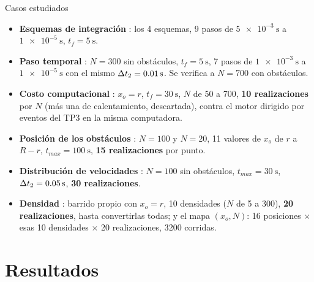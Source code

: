 \documentclass[aspectratio=169,11pt]{beamer}
\begin{document}
\begin{frame}{Casos estudiados}
    \vspace{-0.1em}
    \small
    \begin{itemize}\setlength{\itemsep}{0.55em}
        \item \textbf{Esquemas de integración} : los 4 esquemas,
              9 pasos de $\SI{5e-3}{\second}$ a $\SI{1e-5}{\second}$,
              $t_f = \SI{5}{\second}$.
        \item \textbf{Paso temporal} : $N = 300$ sin obstáculos,
              $t_f = \SI{5}{\second}$, 7 pasos de $\SI{1e-3}{\second}$ a
              $\SI{1e-5}{\second}$ con el mismo $\Delta t_2 = \SI{0.01}{\second}$.
              Se verifica a $N = 700$ con obstáculos.
        \item \textbf{Costo computacional} : $x_o = r$,
              $t_f = \SI{30}{\second}$, $N$ de 50 a 700, \textbf{10 realizaciones}
              por $N$ (más una de calentamiento, descartada), contra el motor
              dirigido por eventos del TP3 en la misma computadora.
        \item \textbf{Posición de los obstáculos} : $N = 100$ y $N = 20$,
              11 valores de $x_o$ de $r$ a $R - r$, $t_{max} = \SI{100}{\second}$,
              \textbf{15 realizaciones} por punto.
        \item \textbf{Distribución de velocidades} : $N = 100$ sin
              obstáculos, $t_{max} = \SI{30}{\second}$, $\Delta t_2 = \SI{0.05}{\second}$,
              \textbf{30 realizaciones}.
        \item \textbf{Densidad} : barrido propio con $x_o = r$, 10 densidades
              ($N$ de 5 a 300), \textbf{20 realizaciones}, hasta convertirlas todas;
              y el mapa $(x_o, N)$: 16 posiciones $\times$ esas 10 densidades $\times$
              20 realizaciones, 3200 corridas.
    \end{itemize}
\end{frame}

\section{Resultados}
\end{document}
